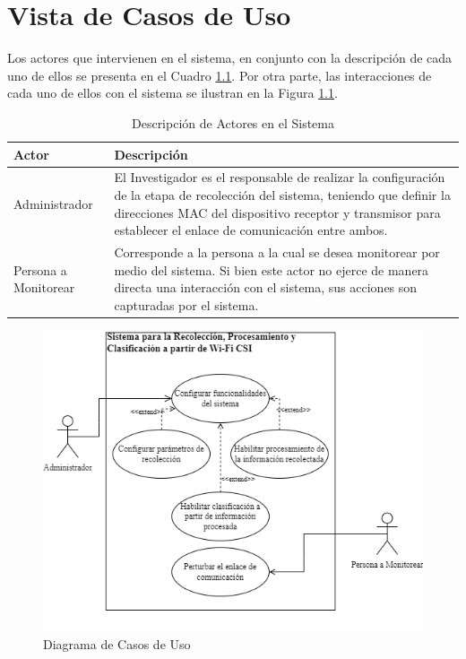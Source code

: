 \documentclass{scrreprt}
\begin{document}
\chapter{Vista de Casos de Uso}

Los actores que intervienen en el sistema, en conjunto con la descripción de cada uno de ellos se presenta en el Cuadro \ref{tab:actores}. Por otra parte, las interacciones de cada uno de ellos con el sistema se ilustran en la Figura \ref{fig:casos_uso}. 
\begin{table}[h!]
    \caption{Descripción de Actores en el Sistema}
    \begin{tabularx}{\textwidth}{|l | X |}
        \hline
        \textbf{Actor} & \textbf{Descripción} \\
        \hline 
        Administrador & El Investigador es el responsable de realizar la configuración de la etapa de recolección del sistema, teniendo que definir la direcciones MAC del dispositivo receptor y transmisor para establecer el enlace de comunicación entre ambos. \\
        \hline 
        Persona a Monitorear & Corresponde a la persona a la cual se desea monitorear por medio del sistema. Si bien este actor no ejerce de manera directa una interacción con el sistema, sus acciones son capturadas por el sistema. \\ 
        \hline 
    \end{tabularx}
    \label{tab:actores}
\end{table}

\begin{figure}[h!]
    \centering
    \includegraphics[scale = 0.57]{images/casos_uso.png}
    \caption{Diagrama de Casos de Uso}
    \label{fig:casos_uso}
\end{figure}
\end{document}
